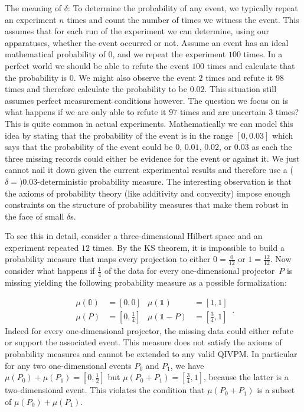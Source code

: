 \documentclass[english,reprint, aps, prl,superscriptaddress, showpacs,
showkeys, longbibliography, amsmath, amssymb, floatfix]{revtex4-1}
\theoremstyle{plain}
\theoremstyle{definition}
\newcommand{\imposs}{\ensuremath{\left[0,0\right]}}
\newcommand{\necess}{\ensuremath{\left[1,1\right]}}
\begin{document}
The meaning of $\delta$: To determine the probability of any event,
we typically repeat an experiment $n$ times and count the number
of times we witness the event. This assumes that for each run of the
experiment we can determine, using our apparatuses, whether the event
occurred or not. Assume an event has an ideal mathematical probability
of $0$, and we repeat the experiment $100$ times. In a perfect world
we should be able to refute the event $100$ times and calculate that
the probability is $0$. We might also observe the event $2$ times
and refute it $98$ times and therefore calculate the probability
to be $0.02$. This situation still assumes perfect measurement conditions
however. The question we focus on is what happens if we are only able
to refute it $97$ times and are uncertain $3$ times? This is quite
common in actual experiments. Mathematically we can model this idea
by stating that the probability of the event is in the range $\left[0,0.03\right]$
which says that the probability of the event could be $0$, $0.01$,
$0.02$, or $0.03$ as each the three missing records could either
be evidence for the event or against it. We just cannot nail it down
given the current experimental results and therefore use a ($\delta=$)$0.03$-deterministic
probability measure. The interesting observation is that the axioms
of probability theory (like additivity and convexity) impose enough
constraints on the structure of probability measures that make them
robust in the face of small $\delta$s.

To see this in detail, consider a three-dimensional Hilbert space
and an experiment repeated $12$ times. By the KS theorem, it is impossible
to build a probability measure that maps every projection to either
$0=\frac{0}{12}$ or $1=\frac{12}{12}$. Now consider what happens
if $\frac{1}{4}$ of the data for every one-dimensional projector~$P$
is missing yielding the following probability measure as a possible
formalization:

\begin{equation}
\begin{aligned}\mu\left(\mathbb{0}\right) & =\imposs & \mu\left(\mathbb{1}\right) & =\necess\\
\mu\left(P\right) & =\left[0,\tfrac{1}{4}\right] & \mu\left(\mathbb{1}-P\right) & =\left[\tfrac{3}{4},1\right]
\end{aligned}
\,.
\end{equation}
Indeed for every one-dimensional projector, the missing data could
either refute or support the associated event. This measure does not
satisfy the axioms of probability measures and cannot be extended
to any valid QIVPM. In particular for any two one-dimensional events
$P_{0}$ and $P_{1}$, we have $\mu\left(P_{0}\right)+\mu\left(P_{1}\right)=\left[0,\tfrac{1}{2}\right]$
but $\mu\left(P_{0}+P_{1}\right)=\left[\tfrac{3}{4},1\right]$, because
the latter is a two-dimensional event. This violates the condition
that $\mu\left(P_{0}+P_{1}\right)$ is a subset of $\mu\left(P_{0}\right)+\mu\left(P_{1}\right)$.
\end{document}
